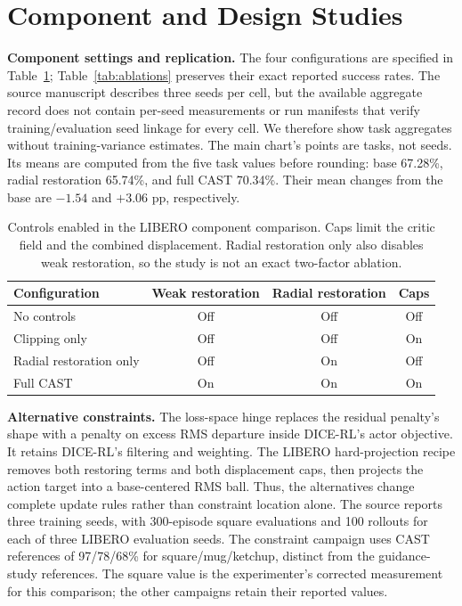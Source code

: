 \section{Component and Design Studies}
\label{supp:components}

\textbf{Component settings and replication.}
The four configurations are specified in Table~\ref{supp:control-settings};
Table~\ref{tab:ablations} preserves their exact reported success rates.
The source manuscript describes three seeds per cell, but the available
aggregate record does not contain per-seed measurements or run manifests
that verify training/evaluation seed linkage for every cell. We therefore
show task aggregates without training-variance estimates. The main chart's
points are tasks, not seeds. Its means are computed from the five task
values before rounding: base 67.28\%, radial restoration 65.74\%, and
full CAST 70.34\%. Their mean changes from the base are $-1.54$ and
$+3.06$ pp, respectively.

\begin{table}[H]
\centering
\caption{Controls enabled in the LIBERO component comparison. Caps
limit the critic field and the combined displacement. Radial restoration
only also disables weak restoration, so the study is not an exact
two-factor ablation.}
\label{supp:control-settings}
\small
\begin{tabular}{@{}lccc@{}}
\toprule
Configuration & Weak restoration & Radial restoration & Caps \\
\midrule
No controls & Off & Off & Off \\
Clipping only & Off & Off & On \\
Radial restoration only & Off & On & Off \\
Full CAST & On & On & On \\
\bottomrule
\end{tabular}
\end{table}

\textbf{Alternative constraints.}
The loss-space hinge replaces the residual penalty's shape with a penalty
on excess RMS departure inside DICE-RL's actor objective. It retains
DICE-RL's filtering and weighting. The LIBERO hard-projection recipe
removes both restoring terms and both displacement caps, then projects
the action target into a base-centered RMS ball. Thus, the alternatives
change complete update rules rather than constraint location alone.
The source reports three training seeds, with 300-episode square
evaluations and 100 rollouts for each of three LIBERO evaluation seeds.
The constraint campaign uses CAST references of 97/78/68\% for
square/mug/ketchup, distinct from the guidance-study references.
The square value is the experimenter's corrected measurement for this
comparison; the other campaigns retain their reported values.

